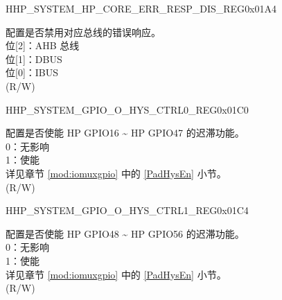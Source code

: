 \begin{register}{H}{HP\_SYSTEM\_HP\_CORE\_ERR\_RESP\_DIS\_REG}{0x01A4}\label{regdesc:HPSYSTEMHPCOREERRRESPDISREG}
%
%
\regnewline%
\begin{regdesc}\begin{reglist}
\label{fielddesc:HPSYSTEMCOREERRRESPDIS}\item [HP\_SYSTEM\_CORE\_ERR\_RESP\_DIS] 配置是否禁用对应总线的错误响应。\\
位[2]：AHB 总线\\
位[1]：DBUS\\
位[0]：IBUS\\
(R/W)
\end{reglist}\end{regdesc}
\end{register}


\begin{register}{H}{HP\_SYSTEM\_GPIO\_O\_HYS\_CTRL0\_REG}{0x01C0}\label{regdesc:HPSYSTEMGPIOOHYSCTRL0REG}
%
\regnewline%
\begin{regdesc}\begin{reglist}
\label{fielddesc:HPSYSTEMGPIO0HYSLOW}\item [HP\_SYSTEM\_GPIO\_0\_HYS\_LOW] 配置是否使能 HP GPIO16 \textasciitilde{} HP GPIO47 的迟滞功能。\\
0：无影响\\
1：使能\\
详见章节 \ref{mod:iomuxgpio} \textit{} 中的 \ref{PadHysEn} 小节。\\
(R/W)
\end{reglist}\end{regdesc}
\end{register}


\begin{register}{H}{HP\_SYSTEM\_GPIO\_O\_HYS\_CTRL1\_REG}{0x01C4}\label{regdesc:HPSYSTEMGPIOOHYSCTRL1REG}
%
%
\regnewline%
\begin{regdesc}\begin{reglist}
\label{fielddesc:HPSYSTEMGPIO0HYSHIGH}\item [HP\_SYSTEM\_GPIO\_0\_HYS\_HIGH] 配置是否使能 HP GPIO48 \textasciitilde{} HP GPIO56 的迟滞功能。\\
0：无影响\\
1：使能\\
详见章节 \ref{mod:iomuxgpio} \textit{} 中的 \ref{PadHysEn} 小节。\\
(R/W)
\end{reglist}\end{regdesc}
\end{register}


